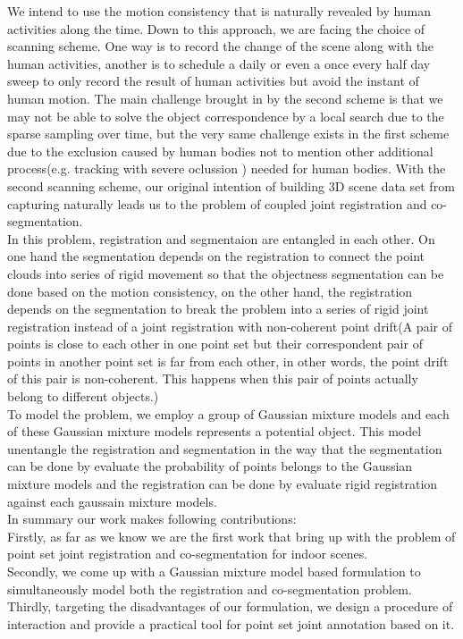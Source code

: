 We intend to use the motion consistency that is naturally revealed by human activities along the time. Down to this approach, we are facing the choice of scanning scheme. One way is to record the change of the scene along with the human activities, another is to  schedule a daily or even a once every half day sweep to only record the result of human activities but avoid the instant of human motion. The main challenge brought in by the second scheme is that we may not be able to solve the object correspondence by a local search due to the sparse sampling over time, but the very same challenge exists in the first scheme due to the exclusion caused by human bodies not to mention other additional process(e.g. tracking with severe oclussion ) needed for human bodies. With the second scanning scheme, our original intention of building 3D scene data set from capturing naturally leads us to the problem of coupled joint registration and co-segmentation.\\ 
In this problem, registration and segmentaion are entangled in each other. On one hand the segmentation depends on the registration to connect the point clouds into series of rigid movement so that the objectness segmentation can be done based on the motion consistency, on the other hand, the registration depends on the segmentation to break the problem into a series of rigid joint registration instead of a joint registration with non-coherent point drift(A pair of points is close to each other in one point set but their correspondent pair of points in another point set is far from each other, in other words, the point drift of this pair is non-coherent. This happens when this pair of points actually belong to different objects.)\\
To model the problem, we employ a group of Gaussian mixture models and each of these Gaussian mixture models represents a potential object. This model unentangle the registration and segmentation in the way that the segmentation can be done by evaluate the probability of points belongs to the Gaussian mixture models and the registration can be done by evaluate rigid registration against each gaussain mixture models.\\
In summary our work makes following contributions: \\
Firstly, as far as we know we are the first work that bring up with the problem of point set joint registration and co-segmentation for indoor scenes.\\
Secondly, we come up with a Gaussian mixture model based formulation to simultaneously model both the registration and co-segmentation problem.\\
Thirdly, targeting the disadvantages of our formulation, we design a procedure of interaction and provide a practical tool for point set joint annotation based on it.
